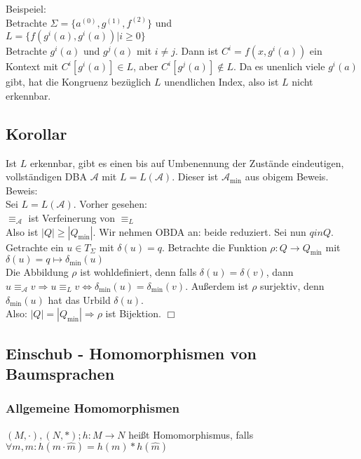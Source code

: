\documentclass[titlepage]{article}
\begin{document}
Beispeiel:\\
Betrachte $\Sigma = \{a^{(0)}, g^{(1)}, f^{(2)} \}$ und \\
$L = \{ f(g^i(a), g^i(a)) | i \geq 0\}$\\

Betrachte $g^i(a)$ und $g^j(a)$ mit $i \neq j$.
Dann ist $C^i = f(x, g^i(a))$ ein Kontext mit $C^i[g^i(a)] \in L$, aber 
$C^i[g^j(a)] \notin L$.
Da es unenlich viele $g^i(a)$ gibt, hat die Kongruenz bez\"uglich $L$ unendlichen Index, 
also ist $L$ nicht erkennbar.

\subsection{Korollar}

Ist $L$ erkennbar, gibt es einen bis auf Umbenennung der Zust\"ande eindeutigen, 
vollst\"andigen DBA $\mathcal{A}$ mit $L = L(\mathcal{A})$.
Dieser ist $\mathcal{A}_\text{min}$ aus obigem Beweis.\\
Beweis:\\
Sei $L = L(\mathcal{A})$. Vorher gesehen:\\
$\equiv_\mathcal{A}$ ist Verfeinerung von $\equiv_L$\\
Also ist $|Q| \geq |Q_\text{min}|$. Wir nehmen OBDA an:
beide reduziert. Sei nun $q in Q$. Getrachte ein $u \in T_\Sigma$ mit $\delta(u) = q$.
Betrachte die Funktion $\rho : Q \to Q_\text{min}$ mit 
$\delta(u) = q \mapsto \delta_\text{min}(u)$\\
Die Abbildung $\rho$ ist wohldefiniert, denn falls $\delta (u) = \delta (v)$, dann 
$u \equiv_\mathcal{A} v \Rightarrow u \equiv_L v \Leftrightarrow \delta_\text{min} (u) = 
\delta_\text{min} (v)$.
Au\ss erdem ist $\rho$ surjektiv, denn $\delta_\text{min} (u)$ hat das Urbild $\delta(u)$.\\
Also: $|Q| = |Q_\text{min}| \Rightarrow \rho$ ist Bijektion. $\Box$

\subsection{Einschub - Homomorphismen von Baumsprachen}

\subsubsection{Allgemeine Homomorphismen}

$(M, \cdot), (N, \ast); h: M \to N$ hei\ss t Homomorphismus, falls \\
$\forall m, \hat{m}: h(m \cdot \hat{m}) = h(m) \ast h(\hat{m})$
\end{document}
